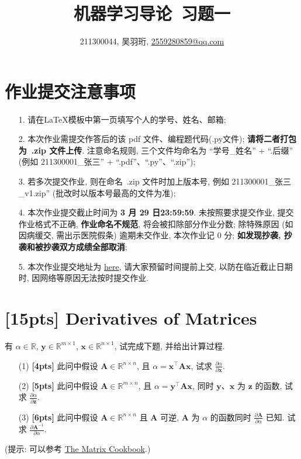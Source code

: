\documentclass[a4paper,UTF8]{article}
\numberwithin{equation}{section}
\theoremstyle{definition}
\def \A {\mathbf{A}}
\def \y {\mathbf{y}}
\def \x {\mathbf{x}}
\def \z {\mathbf{z}}
\begin{document}
\title{机器学习导论\ 习题一}
\author{211300044, 吴羽珩, \href{mailto:邮箱}{2559280859@qq.com}}
\maketitle
\section*{作业提交注意事项}
\begin{tcolorbox}
	\begin{enumerate}
		\item[1.] 请在LaTeX模板中第一页填写个人的学号、姓名、邮箱;
		\item[2.] 本次作业需提交作答后的该 pdf 文件、编程题代码(.py文件); {\color{red}\textbf{请将二者打包为~.zip 文件上传}}. 注意命名规则, 三个文件均命名为 “学号\_姓名” + “.后缀” (例如 211300001\_张三” + “.pdf”、“.py”、“.zip”);
		\item[3.] 若多次提交作业, 则在命名~.zip 文件时加上版本号, 例如 211300001\_张三\_v1.zip” (批改时以版本号最高的文件为准);
		\item[4.] 本次作业提交截止时间为 {\color{red}\textbf{ 3 月 29 日23:59:59}}. 未按照要求提交作业, 提交作业格式不正确, {\color{red}\textbf{作业命名不规范}}, 将会被扣除部分作业分数; 除特殊原因 (如因病缓交, 需出示医院假条) 逾期未交作业, 本次作业记 0 分; {\color{red}\textbf{如发现抄袭, 抄袭和被抄袭双方成绩全部取消}};
		\item[5.] 本次作业提交地址为 \href{https://box.nju.edu.cn/u/d/008080744a60484ea526/}{here}, 请大家预留时间提前上交, 以防在临近截止日期时, 因网络等原因无法按时提交作业.
	\end{enumerate}
\end{tcolorbox}
\newpage


\section{[15pts] Derivatives of Matrices}
 有 $\alpha \in \mathbb{R}$, $\y\in \mathbb{R}^{m×1}$, $\x\in \mathbb{R}^{n×1}$, 试完成下题, 并给出计算过程.
\begin{enumerate}
	\item[(1)] \textbf{[4pts]} 此问中假设 $\A\in \mathbb{R}^{n×n}$, 且 $\alpha=\x^\top\A\x$, 试求 $\frac{\partial \alpha}{\partial \x}$.
	\item[(2)] \textbf{[5pts]} 此问中假设 $\A\in \mathbb{R}^{m×n}$, 且 $\alpha=\y^\top\A\x$, 同时 $\y$、$\x$ 为 $\z$ 的函数, 试求 $\frac{\partial \alpha}{\partial \z}$.
	\item[(3)] \textbf{[6pts]} 此问中假设 $\A\in \mathbb{R}^{n×n}$ 且 $\A$ 可逆, $\A$ 为 $\alpha$ 的函数同时 $\frac{\partial \A}{\partial \alpha}$ 已知. 试求 $\frac{\partial \A^{-1}}{\partial \alpha}$.
\end{enumerate}
(提示: 可以参考 \href{https://www.math.uwaterloo.ca/~hwolkowi/matrixcookbook.pdf}{The Matrix Cookbook}.)
\end{document}
